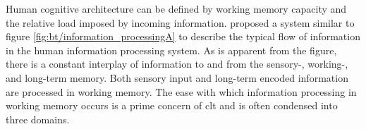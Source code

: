 Human cognitive architecture can be defined by working memory capacity and the relative load imposed by incoming information. \textcite{sweller1988} proposed a system similar to figure \ref{fig:bt/information_processingA} to describe the typical flow of information in the human information processing system. As is apparent from the figure, there is a constant interplay of information to and from the sensory-, working-, and long-term memory. 
Both sensory input and long-term encoded information are processed in working memory.
The ease with which information processing in working memory occurs is a prime concern of \acrshort{clt} and is often condensed into three domains.

